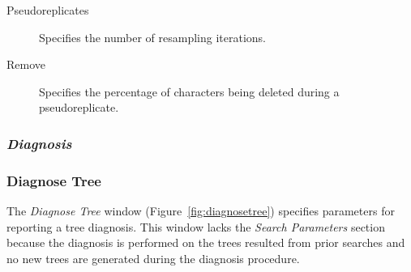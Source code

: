\begin{description}
    \item[Pseudoreplicates] Specifies the number of resampling iterations.
    \item[Remove] Specifies the percentage of characters being deleted during a pseudoreplicate.
\end{description}

\subsubsection{\emph{Diagnosis}}

\subsubsection{Diagnose Tree}

The \emph{Diagnose Tree} window (Figure~\ref{fig:diagnosetree}) specifies parameters for reporting a tree diagnosis. This window lacks the \emph{Search Parameters} section because the diagnosis is performed on the trees resulted from prior searches and no new trees are generated during the diagnosis procedure.

